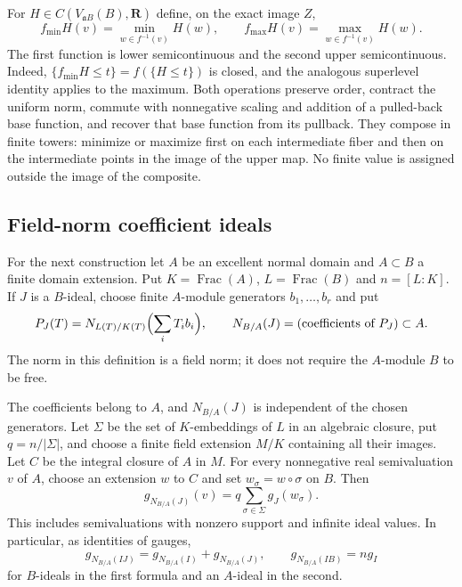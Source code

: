 For $H\in C(V_{\mathfrak aB}(B),\mathbf R)$ define, on the exact image $Z$,
\[
 f_{\min}H(v)=\min_{w\in f^{-1}(v)}H(w),\qquad
 f_{\max}H(v)=\max_{w\in f^{-1}(v)}H(w).
\]
The first function is lower semicontinuous and the second upper
semicontinuous. Indeed,
$\{f_{\min}H\leq t\}=f(\{H\leq t\})$ is closed, and the analogous
superlevel identity applies to the maximum. Both operations preserve
order, contract the uniform norm, commute with nonnegative scaling and
addition of a pulled-back base function, and recover that base function
from its pullback. They compose in finite towers: minimize or maximize
first on each intermediate fiber and then on the intermediate points
in the image of the upper map. No finite value is assigned outside the
image of the composite.

\subsection{Field-norm coefficient ideals}

For the next construction let $A$ be an excellent normal domain and
$A\subset B$ a finite domain extension. Put $K=\operatorname{Frac}(A)$,
$L=\operatorname{Frac}(B)$ and $n=[L:K]$. If $J$ is a $B$-ideal, choose
finite $A$-module generators $b_1,\ldots,b_r$ and put
\[
 P_J(T)=N_{L(T)/K(T)}\Bigl(\sum_iT_ib_i\Bigr),\qquad
 N_{B/A}(J)=(\text{coefficients of }P_J)\subset A.
\]
The norm in this definition is a field norm; it does not require the
$A$-module $B$ to be free.

\begin{proposition}\label{prop:supplied-p126-norm-coefficients}
The coefficients belong to $A$, and $N_{B/A}(J)$ is independent of the
chosen generators. Let $\Sigma$ be the set of $K$-embeddings of $L$ in
an algebraic closure, put $q=n/|\Sigma|$, and choose a finite field
extension $M/K$ containing all their images. Let $C$ be the integral
closure of $A$ in $M$. For every nonnegative real semivaluation $v$ of
$A$, choose an extension $w$ to $C$ and set $w_\sigma=w\circ\sigma$ on
$B$. Then
\[
 g_{N_{B/A}(J)}(v)=q\sum_{\sigma\in\Sigma}g_J(w_\sigma).
 \tag{70.7f}\label{eq:supplied-p126-norm-gauge}
\]
This includes semivaluations with nonzero support and infinite ideal
values. In particular, as identities of gauges,
\[
 g_{N_{B/A}(IJ)}=g_{N_{B/A}(I)}+g_{N_{B/A}(J)},\qquad
 g_{N_{B/A}(IB)}=n g_I
\]
for $B$-ideals in the first formula and an $A$-ideal in the second.
\end{proposition}

